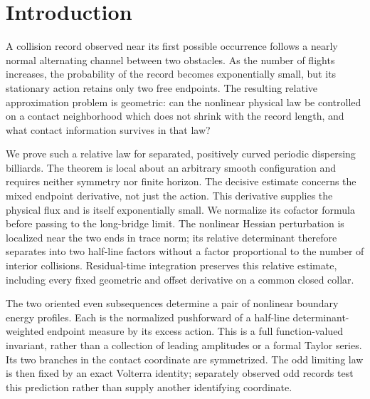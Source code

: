 \section{Introduction}
\label{sec:geometric-results}
A collision record observed near its first possible occurrence follows
a nearly normal alternating channel between two obstacles. As the
number of flights increases, the probability of the record becomes
exponentially small, but its stationary action retains only two free
endpoints. The resulting relative approximation problem is geometric:
can the nonlinear physical law be controlled on a contact neighborhood
which does not shrink with the record length, and what contact
information survives in that law?

We prove such a relative law for separated, positively curved periodic
dispersing billiards. The theorem is local about an arbitrary smooth
configuration and requires neither symmetry nor finite horizon.
The decisive estimate concerns the mixed endpoint derivative, not
just the action. This derivative supplies the physical flux and is
itself exponentially small. We normalize its cofactor formula before
passing to the long-bridge limit. The nonlinear Hessian perturbation
is localized near the two ends in trace norm; its relative determinant
therefore separates into two half-line factors without a factor
proportional to the number of interior collisions. Residual-time
integration preserves this relative estimate, including every fixed
geometric and offset derivative on a common closed collar.

The two oriented even subsequences determine a pair of nonlinear
boundary energy profiles. Each is the normalized pushforward of a
half-line determinant-weighted endpoint measure by its excess action.
This is a full function-valued invariant, rather than a collection
of leading amplitudes or a formal Taylor series. Its two branches
in the contact coordinate are symmetrized. The odd limiting law is
then fixed by an exact Volterra identity; separately observed odd
records test this prediction rather than supply another identifying
coordinate.

